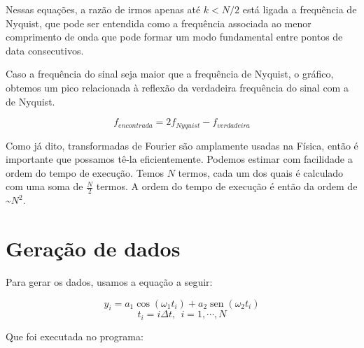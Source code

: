 \documentclass[11pt]{article}
\DeclareMathOperator{\sen}{sen}
\begin{document}
Nessas equações, a razão de irmos apenas até \(k < N/2\) está ligada a frequência de Nyquist, que pode ser entendida como a frequência associada ao menor comprimento de onda que pode formar um modo fundamental entre pontos de data consecutivos.

Caso a frequência do sinal seja maior que a frequência de Nyquist, o gráfico, obtemos um pico relacionada à reflexão da verdadeira frequência do sinal com a de Nyquist.

\begin{latex}
\begin{equation}
\label{eq:Frequência encontrada}
  f_{encontrada} = 2f_{Nyquist} - f_{verdadeira}
\end{equation}
\end{latex}

Como já dito, transformadas de Fourier são amplamente usadas na Física, então é importante que possamos tê-la eficientemente.
Podemos estimar com facilidade a ordem do tempo de execução. Temos \(N\) termos, cada um dos quais é calculado com uma soma de \(\frac{N}{2}\) termos. A ordem do tempo de execução é então da ordem de \textasciitilde{}\(N^2\).

\section*{Geração de dados}
\label{sec:orgdd53280}
Para gerar os dados, usamos a equação a seguir:
\begin{latex}
\begin{equation}
y_{i} = a_{1}\cos{(\omega_{1}t_{i})} + a_{2}\sen(\omega_{2}t_{i})
\end{equation}
$$t_{i} = i\Delta t,\ \ i = 1, \cdots, N$$
\end{latex}

Que foi executada no programa:
\end{document}
